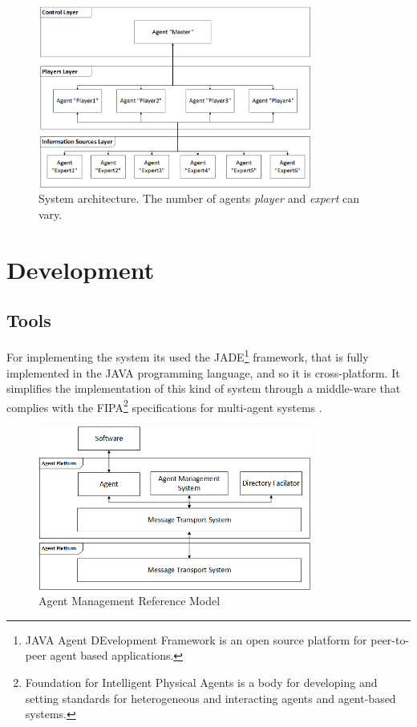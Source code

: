 \documentclass{llncs}
\begin{document}
\begin{figure}
	\centering
    \includegraphics[width=0.8\textwidth]{arch.png}
    \caption{System architecture. The number of agents \textit{player} and \textit{expert} can vary.}
    \label{arch}
\end{figure}


\section{Development}\label{sec:Development}
\subsection{Tools}\label{sec:Tools}

For implementing the system its used the JADE\footnote{JAVA Agent DEvelopment Framework is an open source platform for peer-to-peer agent based applications.} framework, that is fully implemented in the JAVA programming language, and so it is cross-platform. It simplifies the implementation of this kind of system through a middle-ware that complies with the FIPA\footnote{ Foundation for Intelligent Physical Agents is a body for developing and setting standards for heterogeneous and interacting agents and agent-based systems.} specifications for multi-agent systems \cite{architecture}.

\begin{figure}
	\centering
    \includegraphics[width=0.8\textwidth]{fipa.png}
    \caption{Agent Management Reference Model}
    \label{jade}
\end{figure}
\end{document}
